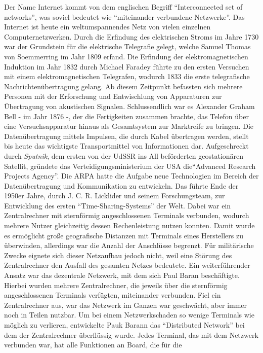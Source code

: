 Der Name Internet kommt von dem englischen Begriff ``Interconnected set of
networks'', was soviel bedeutet wie "`miteinander verbundene Netzwerke"'.
Das Internet ist heute ein weltumspannendes Netz von vielen einzelnen
Computernetzwerken.
Durch die Erfindung des elektrischen Stroms im Jahre 1730 war der
Grundstein für die elektrische Telegrafie gelegt, welche Samuel Thomas
von Soemmerring im Jahr 1809 erfand.
Die Erfindung der elektromagnetischen Induktion im Jahr 1832 durch Michael
Faradey führte zu den ersten Versuchen mit einem elektromagnetischen
Telegrafen, wodurch 1833 die erste telegrafische Nachrichtenübertragung
gelang.
Ab diesem Zeitpunkt befassten sich mehrere Personen mit der Erforschung und
Entwischlung von Apparaturen zur Übertragung von akustischen Signalen.
Schlussendlich war es Alexander Graham Bell - im Jahr 1876 -, der die
Fertigkeiten zusammen brachte, das Telefon über eine Versuchsapparatur
hinaus als Gesamtsystem zur Marktreife zu bringen.
Die Datenübertragung mittels Impulsen, die durch Kabel übertragen werden,
stellt bis heute das wichtigste Transportmittel von Informationen dar.
Aufgeschreckt durch \emph{Sputnik}, dem ersten von der UdSSR ins All
beförderten geostationären Satellit, gründete das Verteidigungsministerium
der USA die``Advanced Research Projects Agency''. Die ARPA hatte die Aufgabe
neue Technologien im Bereich der Datenübertragung und Kommunikation zu
entwickeln.
Das führte Ende der 1950er Jahre, durch J. C. R. Licklider und seinem
Forschungsteam, zur Entwicklung des ersten ``Time-Sharing-Systems'' der Welt.
Dabei war ein Zentralrechner mit sternförmig angeschlossenen Terminals
verbunden, wodurch mehrere Nutzer gleichzeitig dessen Rechenleistung nutzen
konnten. Damit wurde es ermöglicht große geografische Distanzen mit Terminals
eines Herstellers zu überwinden, allerdings war die Anzahl der Anschlüsse
begrenzt. Für militärische Zwecke eignete sich dieser Netzaufbau jedoch nicht,
weil eine Störung des Zentralrechner den Ausfall des gesamten Netzes bedeutete.
Ein weiterführender Ansatz war das dezentrale Netzwerk, mit dem sich Paul
Baran beschäftigte. Hierbei wurden mehrere Zentralrechner, die jeweils über
die sternförmig angeschlossenen Terminals verfügten, miteinander verbunden.
Fiel ein Zentralrechner aus, war das Netzwerk im Ganzen war geschwächt, aber
immer noch in Teilen nutzbar. Um bei einem Netzwerkschaden so wenige Terminals
wie möglich zu verlieren, entwickelte Pauk Barann das ``Distributed Network''
bei dem der Zentralrechner überflüssig wurde. Jedes Terminal, das mit dem
Netzwerk verbunden war, hat alle Funktionen an Board, die für die
